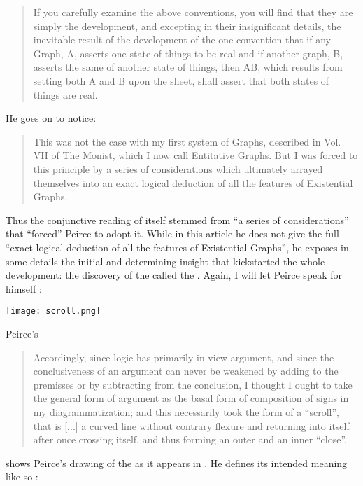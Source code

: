 \begin{scope}
\begin{quote}
If you carefully examine the above conventions, you will find that they are
simply the development, and excepting in their insignificant details, the
inevitable result of the development of the one convention that if any Graph, A,
asserts one state of things to be real and if another graph, B, asserts the same
of another state of things, then AB, which results from setting both A and B
upon the sheet, shall assert that both states of things are real.
\end{quote}

He goes on to notice:

\begin{quote}
   This was not the case with my first system of Graphs, described in Vol. VII
of The Monist, which I now call Entitative Graphs. But I was forced to this
principle by a series of considerations which ultimately arrayed themselves into
an exact logical deduction of all the features of Existential Graphs.
\end{quote}

\AP
Thus the conjunctive reading of  itself stemmed from ``a
series of considerations'' that ``forced'' Peirce to adopt it. While in this
article he does not give the full ``exact logical deduction of all the features
of Existential Graphs'', he exposes in some details the initial and determining
insight that kickstarted the whole development: the discovery of the 
called the . Again, I will let Peirce speak for himself
\cite[pp.~533--534]{peirce_prolegomena_1906}:

\begin{marginfigure}
  \texttt{[image: scroll.png]}
  \caption{Peirce's }
\end{marginfigure}

\begin{quote}
  Accordingly, since logic has primarily in view argument, and since the
conclusiveness of an argument can never be weakened by adding to the premisses
or by subtracting from the conclusion, I thought I ought to take the general
form of argument as the basal form of composition of signs in my
diagrammatization; and this necessarily took the form of a ``scroll'', that is
[...] a curved line without contrary flexure and returning into itself after
once crossing itself, and thus forming an outer and an inner ``close''.
\end{quote}

 shows Peirce's drawing of the  as it appears in
\cite[Fig.~5]{peirce_prolegomena_1906}. He defines its intended meaning like so
\cite[p.~534--535]{peirce_prolegomena_1906}:


\end{scope}
